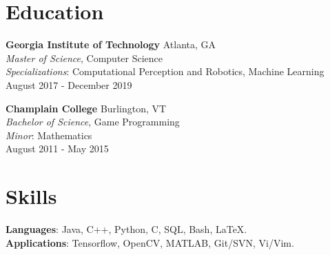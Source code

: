 \documentclass[margin]{res}
\begin{document}
\begin{resume}

\section{Education}
\phantom{spacing}
\par
\textbf{Georgia Institute of Technology} \hfill Atlanta, GA\\
{\sl Master of Science}, Computer Science
\\
{\sl Specializations}: Computational Perception and Robotics, Machine Learning
\\
August 2017 - December 2019

\par
\textbf{Champlain College} \hfill Burlington, VT\\
{\sl Bachelor of Science}, Game Programming
\\
{\sl Minor}: Mathematics
\\
August 2011 - May 2015


\section{Skills}
\phantom{spacing}
\par
\textbf{Languages}: Java, C++, Python, C, SQL, Bash, \LaTeX.
\\
\textbf{Applications}: Tensorflow, OpenCV, MATLAB, Git/SVN, Vi/Vim. 


\end{resume}
\end{document}
